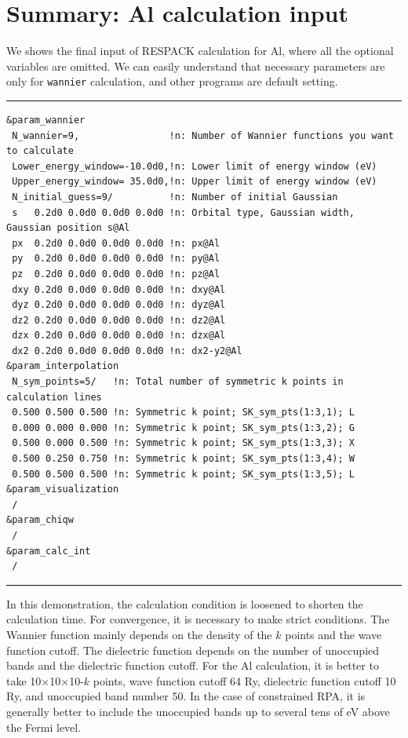 \documentclass{article}
\begin{document}
\section{\label{Al-summary}Summary: Al calculation input}
We shows the final input of RESPACK calculation for Al, where all the optional variables are omitted. We can easily understand that necessary parameters are only for {\tt wannier} calculation, and other programs are default setting. 
\vspace{3mm}\hrule
\begin{verbatim}
&param_wannier 
 N_wannier=9,                !n: Number of Wannier functions you want to calculate
 Lower_energy_window=-10.0d0,!n: Lower limit of energy window (eV)
 Upper_energy_window= 35.0d0,!n: Upper limit of energy window (eV)
 N_initial_guess=9/          !n: Number of initial Gaussian
 s   0.2d0 0.0d0 0.0d0 0.0d0 !n: Orbital type, Gaussian width, Gaussian position s@Al
 px  0.2d0 0.0d0 0.0d0 0.0d0 !n: px@Al
 py  0.2d0 0.0d0 0.0d0 0.0d0 !n: py@Al
 pz  0.2d0 0.0d0 0.0d0 0.0d0 !n: pz@Al
 dxy 0.2d0 0.0d0 0.0d0 0.0d0 !n: dxy@Al
 dyz 0.2d0 0.0d0 0.0d0 0.0d0 !n: dyz@Al
 dz2 0.2d0 0.0d0 0.0d0 0.0d0 !n: dz2@Al
 dzx 0.2d0 0.0d0 0.0d0 0.0d0 !n: dzx@Al
 dx2 0.2d0 0.0d0 0.0d0 0.0d0 !n: dx2-y2@Al
&param_interpolation   
 N_sym_points=5/   !n: Total number of symmetric k points in calculation lines
 0.500 0.500 0.500 !n: Symmetric k point; SK_sym_pts(1:3,1); L
 0.000 0.000 0.000 !n: Symmetric k point; SK_sym_pts(1:3,2); G
 0.500 0.000 0.500 !n: Symmetric k point; SK_sym_pts(1:3,3); X
 0.500 0.250 0.750 !n: Symmetric k point; SK_sym_pts(1:3,4); W
 0.500 0.500 0.500 !n: Symmetric k point; SK_sym_pts(1:3,5); L 
&param_visualization
 /  
&param_chiqw 
 /
&param_calc_int 
 /
\end{verbatim}
\hrule\vspace{3mm}
In this demonstration, the calculation condition is loosened to shorten the calculation time. For convergence, it is necessary to make strict conditions. The Wannier function mainly depends on the density of the $k$ points and the wave function cutoff. The dielectric function depends on the number of unoccupied bands and the dielectric function cutoff. For the Al calculation, it is better to take 10$\times$10$\times$10-$k$ points, wave function cutoff 64 Ry, dielectric function cutoff 10 Ry, and unoccupied band number 50. In the case of constrained RPA, it is generally better to include the unoccupied bands up to several tens of eV above the Fermi level.

\clearpage 
\end{document}
